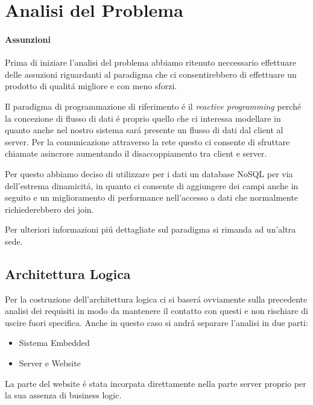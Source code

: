 \section{Analisi del Problema}

\paragraph{Assunzioni}
Prima di iniziare l'analisi del problema abbiamo ritenuto neccessario effettuare delle assuzioni riguardanti al paradigma che ci consentirebbero di effettuare un prodotto di qualit\'a migliore e con meno sforzi.

Il paradigma di programmazione di riferimento \'e il \textit{reactive programming} perch\'e la concezione di flusso di dati \'e proprio quello che ci interessa modellare in quanto anche nel nostro sistema sar\'a presente un flusso di dati dal client al server. Per la comunicazione attraverso la rete questo ci consente di sfruttare chiamate asincrore aumentando il disaccoppiamento tra client e server.

Per questo abbiamo deciso di utilizzare per i dati un database NoSQL per via dell'estrema dinamicit\'a, in quanto ci consente di aggiungere dei campi anche in seguito e un miglioramento di performance nell'accesso a dati che normalmente richiederebbero dei join.

Per ulteriori informazioni pi\'u dettagliate sul paradigma si rimanda ad un'altra sede. 

\subsection{Architettura Logica}

Per la costruzione dell'architettura logica ci si baser\'a ovviamente sulla precedente analisi dei requisiti in modo da mantenere il contatto con questi e non rischiare di uscire fuori specifica. Anche in questo caso si andr\'a separare l'analisi in due parti:

\begin{itemize}
\item Sistema Embedded
\item Server e Website
\end{itemize}

La parte del website \'e stata incorpata direttamente nella parte server proprio per la sua assenza di business logic.

